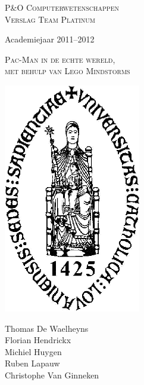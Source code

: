 
\begin{titlepage}

\fontsize{12pt}{14pt}\selectfont

\begin{center}

\vspace{1cm}

\fontsize{14pt}{17pt}\selectfont
\textsc{P\&O Computerwetenschappen\\
Verslag Team Platinum}
\fontsize{12pt}{14pt}\selectfont
\vspace{0.3cm}

\vspace{1.2cm}

Academiejaar 2011--2012

\vspace{1.5cm}

\fontsize{17.28pt}{21pt}\selectfont

{\textsc{Pac-Man in de echte wereld,\\ met behulp van Lego Mindstorms}}

\fontsize{12pt}{14pt}\selectfont

\vspace{1.5cm}

\includegraphics[height=10cm]{resources/Logo-Kul}
\begin{flushright}
Thomas De Waelheyns\\Florian Hendrickx\\Michiel Huygen\\Ruben Lapauw\\Christophe Van Ginneken
\end{flushright}
\end{center}
\end{titlepage}

\thispagestyle{empty}

